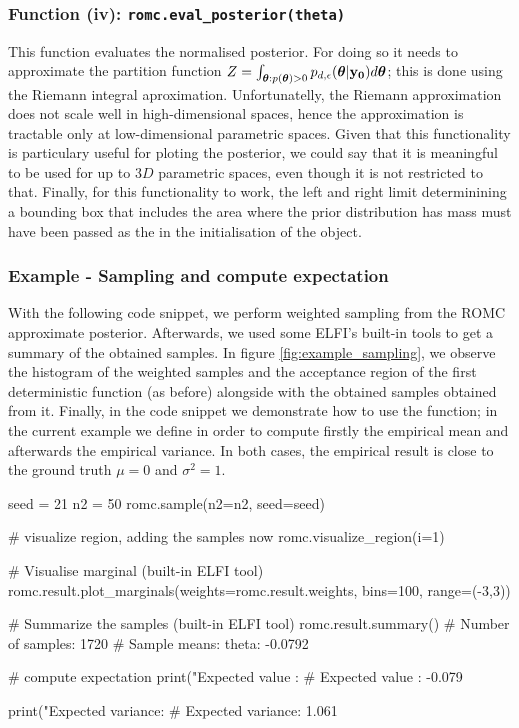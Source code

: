 \subsubsection*{Function (iv):
  \texttt{romc.eval_posterior(theta)}}

This function evaluates the normalised posterior. For doing so it
needs to approximate the partition function
$Z = \int_{\boldsymbol{\theta} : p(\boldsymbol{\theta})>0}
p_{d,\epsilon}(\boldsymbol{\theta}|\mathbf{y_0})d\boldsymbol{\theta}$; this is done using the Riemann
integral aproximation. Unfortunatelly, the Riemann approximation does
not scale well in high-dimensional spaces, hence the approximation is
tractable only at low-dimensional parametric spaces. Given that this
functionality is particulary useful for ploting the posterior, we
could say that it is meaningful to be used for up to $3D$ parametric
spaces, even though it is not restricted to that. Finally, for this
functionality to work, the left and right limit determinining a
bounding box that includes the area where the prior distribution has
mass must have been passed as the  in the
initialisation of the  object.

\subsubsection*{Example - Sampling and compute expectation}

With the following code snippet, we perform weighted sampling from the
ROMC approximate posterior. Afterwards, we used some ELFI's built-in
tools to get a summary of the obtained samples. In figure
\ref{fig:example_sampling}, we observe the histogram of the weighted
samples and the acceptance region of the first deterministic function
(as before) alongside with the obtained samples obtained from
it. Finally, in the code snippet we demonstrate how to use the
 function; in the current example we
define  in order to compute firstly the empirical mean and
afterwards the empirical variance. In both cases, the empirical result
is close to the ground truth $\mu = 0$ and $\sigma^2 = 1$.

\begin{pythoncode}
  seed = 21
  n2 = 50
  romc.sample(n2=n2, seed=seed)

  # visualize region, adding the samples now
  romc.visualize_region(i=1)

  # Visualise marginal (built-in ELFI tool)
  romc.result.plot_marginals(weights=romc.result.weights, bins=100, range=(-3,3))

  # Summarize the samples (built-in ELFI tool)
  romc.result.summary()
  # Number of samples: 1720
  # Sample means: theta: -0.0792

  # compute expectation
  print("Expected value   : %
  # Expected value   : -0.079

  print("Expected variance: %
  # Expected variance: 1.061
\end{pythoncode}

